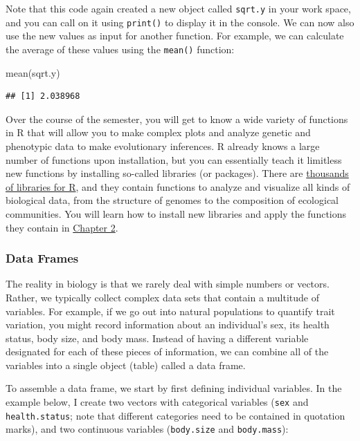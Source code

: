\documentclass[
]{book}
\newenvironment{Shaded}{\begin{snugshade}}{\end{snugshade}}
\newcommand{\FunctionTok}[1]{\textcolor[rgb]{0.00,0.00,0.00}{#1}}
\newcommand{\NormalTok}[1]{#1}
\begin{document}
Note that this code again created a new object called \texttt{sqrt.y} in your work space, and you can call on it using \texttt{print()} to display it in the console. We can now also use the new values as input for another function. For example, we can calculate the average of these values using the \texttt{mean()} function:

\begin{Shaded}
\begin{Highlighting}[]
\FunctionTok{mean}\NormalTok{(sqrt.y)}
\end{Highlighting}
\end{Shaded}

\begin{verbatim}
## [1] 2.038968
\end{verbatim}

Over the course of the semester, you will get to know a wide variety of functions in R that will allow you to make complex plots and analyze genetic and phenotypic data to make evolutionary inferences. R already knows a large number of functions upon installation, but you can essentially teach it limitless new functions by installing so-called libraries (or packages). There are \href{https://cran.r-project.org/web/packages/available_packages_by_name.html}{thousands of libraries for R}, and they contain functions to analyze and visualize all kinds of biological data, from the structure of genomes to the composition of ecological communities. You will learn how to install new libraries and apply the functions they contain in \href{evidence-for-evolution.html\#libraries}{Chapter 2}.

\hypertarget{data-frames}{%
\subsubsection*{Data Frames}\label{data-frames}}

The reality in biology is that we rarely deal with simple numbers or vectors. Rather, we typically collect complex data sets that contain a multitude of variables. For example, if we go out into natural populations to quantify trait variation, you might record information about an individual's sex, its health status, body size, and body mass. Instead of having a different variable designated for each of these pieces of information, we can combine all of the variables into a single object (table) called a data frame.

To assemble a data frame, we start by first defining individual variables. In the example below, I create two vectors with categorical variables (\texttt{sex} and \texttt{health.status}; note that different categories need to be contained in quotation marks), and two continuous variables (\texttt{body.size} and \texttt{body.mass}):
\end{document}
